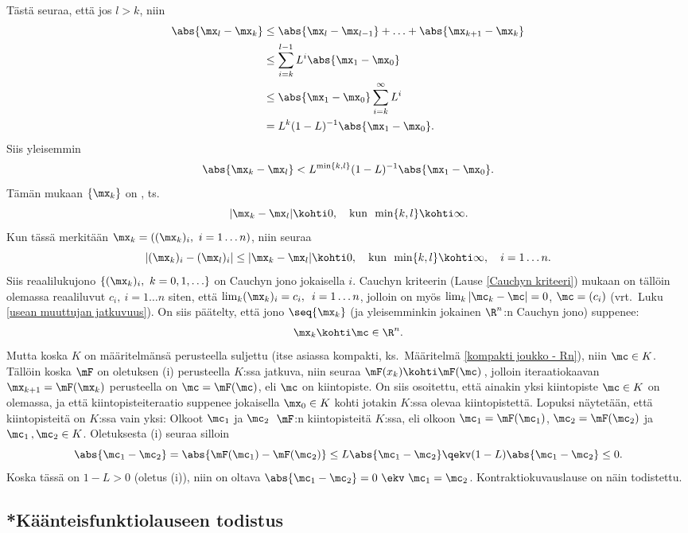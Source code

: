 Tästä seuraa, että jos $l>k$, niin
\begin{align*}
\abs{\mx_l-\mx_k} &\le \abs{\mx_l-\mx_{l-1}}+\ldots + \abs{\mx_{k+1}-\mx_k} \\
&\le \sum_{i=k}^{l-1} L^i\abs{\mx_1-\mx_0} \\
&\le \abs{\mx_1-\mx_0}\sum_{i=k}^{\infty} L^i \\
&=L^k(1-L)^{-1}\abs{\mx_1-\mx_0}.
\end{align*}
Siis yleisemmin
\[
\abs{\mx_k-\mx_l}<L^{\min \{k,l\}} (1-L)^{-1}\abs{\mx_1-\mx_0}.
\]
%
Tämän mukaan $\{\mx_k\}$ on , ts.\
\[
|\mx_k-\mx_l| \kohti 0, \quad \text{kun}\,\ \min\{k,l\} \kohti \infty.
\]
Kun tässä merkitään $\mx_k = ((\mx_k)_i,\ i=1 \ldots n)$, niin seuraa
\[
|(\mx_k)_i-(\mx_l)_i| \le |\mx_k-\mx_l| \kohti 0, \quad 
               \text{kun}\,\ \min\{k,l\} \kohti \infty, \quad i=1 \ldots n.
\]
Siis reaalilukujono $\{(\mx_k)_i,\ k=0,1,\ldots\}$ on Cauchyn jono jokaisella $i$. Cauchyn
kriteerin (Lause \ref{Cauchyn kriteeri}) mukaan on tällöin olemassa reaaliluvut
$c_i,\ i=1 \ldots n$ siten, että $\lim_k (\mx_k)_i = c_i,\,\ i=1 \ldots n$, jolloin on myös
$\lim_k|\mc_k-\mc|=0$, $\mc=(c_i)$ (vrt.\ Luku \ref{usean muuttujan jatkuvuus}). On siis
päätelty, että jono $\seq{\mx_k}$ (ja yleisemminkin jokainen $\R^n$:n Cauchyn jono) suppenee:  
\[
\mx_k\kohti \mc\in \R^n.
\]
Mutta koska $K$ on määritelmänsä perusteella suljettu (itse asiassa kompakti, ks.\
Määritelmä \ref{kompakti joukko - Rn}), niin $\mc\in K$. Tällöin koska $\mF$ on oletuksen (i)
perusteella $K$:ssa jatkuva, niin seuraa $\mF(x_k)\kohti\mF(\mc)\,$, jolloin iteraatiokaavan 
$\mx_{k+1}=\mF(\mx_k)$ perusteella on $\mc=\mF(\mc)$, eli $\mc$ on kiintopiste. On siis 
osoitettu, että ainakin yksi kiintopiste $\mc\in K$ on olemassa, ja että kiintopisteiteraatio
suppenee jokaisella $\mx_0\in K$ kohti jotakin $K$:ssa olevaa kiintopistettä. Lopuksi
näytetään, että kiintopisteitä on $K$:ssa vain yksi: Olkoot $\mc_1$ ja $\mc_2\,$ $\mF$:n
kiintopisteitä $K$:ssa, eli olkoon $\mc_1=\mF(\mc_1)$, $\mc_2=\mF(\mc_2)$ ja
$\mc_1\,,\mc_2\in K$. Oletuksesta (i) seuraa silloin
\[
\abs{\mc_1-\mc_2} =   \abs{\mF(\mc_1)-\mF(\mc_2)} 
                  \le L\abs{\mc_1-\mc_2} \qekv (1-L)\abs{\mc_1-\mc_2} \le 0.
\]
Koska tässä on $1-L>0$ (oletus (i)), niin on oltava $\abs{\mc_1-\mc_2}=0\ \ekv\ \mc_1=\mc_2$. 
Kontraktiokuvauslause on näin todistettu. \loppu
\index{kiintopisteiteraatio|)}

\subsection*{*Käänteisfunktiolauseen todistus}

